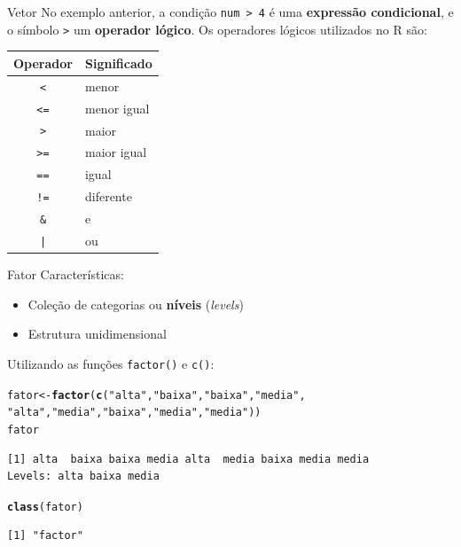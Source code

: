\documentclass[10pt,handout]{beamer}\usepackage[]{graphicx}\usepackage[]{color}
\makeatletter
\newcommand{\hlstr}[1]{\textcolor[rgb]{0.282,0.239,0.545}{#1}}%
\newcommand{\hlstd}[1]{\textcolor[rgb]{0.345,0.345,0.345}{#1}}%
\newcommand{\hlkwb}[1]{\textcolor[rgb]{0.69,0.353,0.396}{#1}}%
\newcommand{\hlkwd}[1]{\textcolor[rgb]{0.282,0.239,0.545}{\textbf{#1}}}%
\newenvironment{kframe}{%
 \def\at@end@of@kframe{}%
 \ifinner\ifhmode%
  \def\at@end@of@kframe{\end{minipage}}%
  \begin{minipage}{\columnwidth}%
 \fi\fi%
 \def\FrameCommand##1{\hskip\@totalleftmargin \hskip-\fboxsep
 \colorbox{shadecolor}{##1}\hskip-\fboxsep
     \hskip-\linewidth \hskip-\@totalleftmargin \hskip\columnwidth}%
 \MakeFramed {\advance\hsize-\width
   \@totalleftmargin\z@ \linewidth\hsize
   \@setminipage}}%
 {\par\unskip\endMakeFramed%
 \at@end@of@kframe}
\newenvironment{knitrout}{}{} %
\makeatother
\begin{document}
\begin{frame}[fragile]{Vetor}
No exemplo anterior, a condição \texttt{num > 4} é uma
\textbf{expressão condicional}, e o símbolo \texttt{>} um
\textbf{operador lógico}. Os operadores lógicos utilizados no R são:

\begin{table}[!ht]
    \centering
        \begin{tabular}{cl}
        \hline
        \multicolumn{0}{c}{Operador} & \multicolumn{1}{c}{Significado} \\
        \hline
        \verb|<| & menor \\
        \verb|<=| & menor igual \\
        \verb|>| & maior \\
        \verb|>=| & maior igual \\
        \verb|==| & igual \\
        \verb|!=| & diferente \\
        \verb|&| & e \\
        \verb+|+ & ou \\
        \hline
        \end{tabular}
\end{table}
\end{frame}

\begin{frame}[fragile]{Fator}
Características:
\begin{itemize}
\item Coleção de categorias ou \textbf{níveis} (\emph{levels})
\item Estrutura unidimensional
\end{itemize}
Utilizando as funções \texttt{factor()} e \texttt{c()}:
\begin{knitrout}\small
{}\color{fgcolor}\begin{kframe}
\begin{alltt}
\hlstd{fator} \hlkwb{<-} \hlkwd{factor}\hlstd{(}\hlkwd{c}\hlstd{(}\hlstr{"alta"}\hlstd{,}\hlstr{"baixa"}\hlstd{,}\hlstr{"baixa"}\hlstd{,}\hlstr{"media"}\hlstd{,}
                  \hlstr{"alta"}\hlstd{,}\hlstr{"media"}\hlstd{,}\hlstr{"baixa"}\hlstd{,}\hlstr{"media"}\hlstd{,}\hlstr{"media"}\hlstd{))}
\hlstd{fator}
\end{alltt}
\begin{verbatim}
[1] alta  baixa baixa media alta  media baixa media media
Levels: alta baixa media
\end{verbatim}
\begin{alltt}
\hlkwd{class}\hlstd{(fator)}
\end{alltt}
\begin{verbatim}
[1] "factor"
\end{verbatim}
\end{kframe}
\end{knitrout}

\end{frame}
\end{document}
